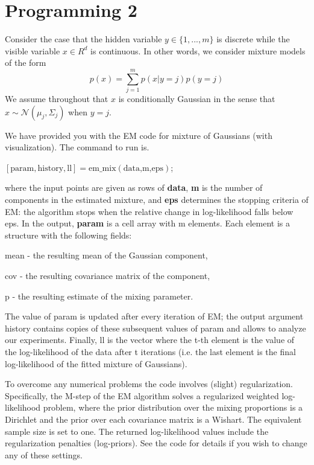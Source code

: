 \documentclass{article}
\theoremstyle{definition}
\theoremstyle{definition}
\theoremstyle{remark}
\begin{document}
\section*{Programming 2}
Consider the case that the hidden variable $y \in \{1, ..., m\}$ is discrete while the visible variable $x \in R^d$
is continuous. In other words, we consider mixture models of the form
\begin{equation}
  p(x) = \sum_{j = 1}^m p(x|y = j)p(y=j)
\end{equation}
We assume throughout that $x$ is conditionally Gaussian in the sense that $x \sim \mathcal{N}(\mu_j
, \Sigma_j)$ when $y = j$.

We have provided you with the EM code for mixture of Gaussians (with visualization).
The command to run is.

$[\text{param},\text{history},\text{ll}] = \text{em}\_\text{mix}(\text{data,m,eps})$;

where the input points are given as rows of \textbf{data}, \textbf{m} is the number of components in the
estimated mixture, and \textbf{eps} determines the stopping criteria of EM: the algorithm stops
when the relative change in log-likelihood falls below eps. In the output, \textbf{param} is a cell
array with m elements. Each element is a structure with the following fields:

mean - the resulting mean of the Gaussian component,

cov - the resulting covariance matrix of the component,

p - the resulting estimate of the mixing parameter.

The value of param is updated after every iteration of EM; the output argument history
contains copies of these subsequent values of param and allows to analyze our experiments.
Finally, ll is the vector where the t-th element is the value of the log-likelihood of the data
after t iterations (i.e. the last element is the final log-likelihood of the fitted mixture of
Gaussians).

To overcome any numerical problems the code involves (slight) regularization. Specifically,
the M-step of the EM algorithm solves a regularized weighted log-likelihood problem, where
the prior distribution over the mixing proportions is a Dirichlet and the prior over each
covariance matrix is a Wishart. The equivalent sample size is set to one. The returned log-likelihood
values include the regularization penalties (log-priors). See the code for details
if you wish to change any of these settings.
\end{document}
